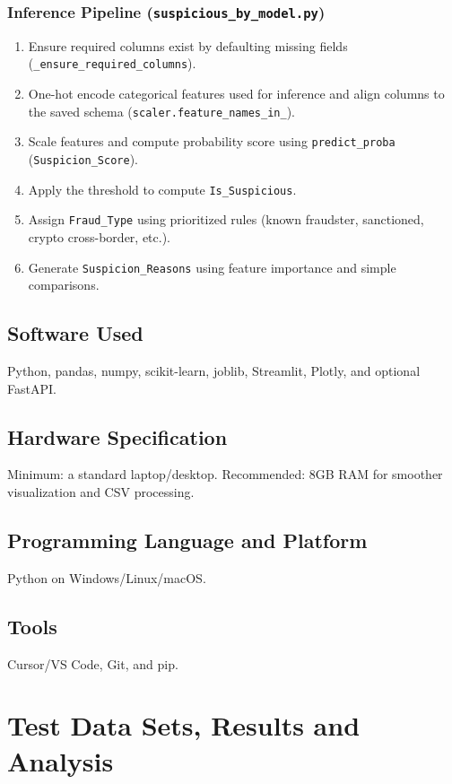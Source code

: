 \documentclass[12pt,a4paper]{report}
\begin{document}
\subsection{Inference Pipeline (\texttt{suspicious\_by\_model.py})}
\begin{enumerate}
  \item Ensure required columns exist by defaulting missing fields (\texttt{\_ensure\_required\_columns}).
  \item One-hot encode categorical features used for inference and align columns to the saved schema (\texttt{scaler.feature\_names\_in\_}).
  \item Scale features and compute probability score using \texttt{predict\_proba} (\texttt{Suspicion\_Score}).
  \item Apply the threshold to compute \texttt{Is\_Suspicious}.
  \item Assign \texttt{Fraud\_Type} using prioritized rules (known fraudster, sanctioned, crypto cross-border, etc.).
  \item Generate \texttt{Suspicion\_Reasons} using feature importance and simple comparisons.
\end{enumerate}

\section{Software Used}
Python, pandas, numpy, scikit-learn, joblib, Streamlit, Plotly, and optional FastAPI.

\section{Hardware Specification}
Minimum: a standard laptop/desktop. Recommended: 8GB RAM for smoother visualization and CSV processing.

\section{Programming Language and Platform}
Python on Windows/Linux/macOS.

\section{Tools}
Cursor/VS Code, Git, and pip.

\chapter{Test Data Sets, Results and Analysis}
\end{document}
